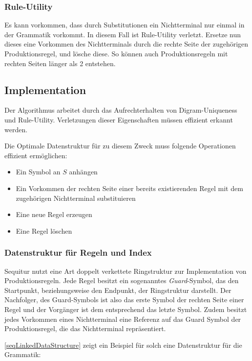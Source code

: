 \subsubsection{Rule-Utility}

Es kann vorkommen, dass durch Substitutionen ein Nichtterminal nur einmal in der Grammatik vorkommt. In diesem Fall ist Rule-Utility verletzt. Ersetze nun dieses eine Vorkommen des Nichtterminals durch die rechte Seite der zugehörigen Produktionsregel, und lösche diese. So können auch Produktionsregeln mit rechten Seiten länger als 2 entstehen.

\subsection{Implementation}

Der Algorithmus arbeitet durch das Aufrechterhalten von Digram-Uniqueness und Rule-Utility. Verletzungen dieser Eigenschaften müssen effizient erkannt werden.

Die Optimale Datenstruktur für zu diesem Zweck muss folgende Operationen effizient ermöglichen:

\begin{itemize}
	\item Ein Symbol an $S$ anhängen
	\item Ein Vorkommen der rechten Seite einer bereits existierenden Regel mit dem zugehörigen Nichtterminal substituieren
	\item Eine neue Regel erzeugen
	\item Eine Regel löschen
\end{itemize}

\subsubsection{Datenstruktur für Regeln und Index}

Sequitur nutzt eine Art doppelt verkettete Ringstruktur zur Implementation von Produktionsregeln. 
Jede Regel besitzt ein sogenanntes \emph{Guard}-Symbol, das den Startpunkt, beziehungsweise den Endpunkt, der Ringstruktur darstellt. Der Nachfolger, des Guard-Symbols ist also das erste Symbol der rechten Seite einer Regel und der Vorgänger ist dem entsprechend das letzte Symbol.
Zudem besitzt jedes Vorkommen eines Nichtterminal eine Referenz auf das Guard Symbol der Produktionsregel, die das Nichtterminal repräsentiert. 

\autoref{seqLinkedDataStructure} zeigt ein Beispiel für solch eine Datenstruktur für die Grammatik:


